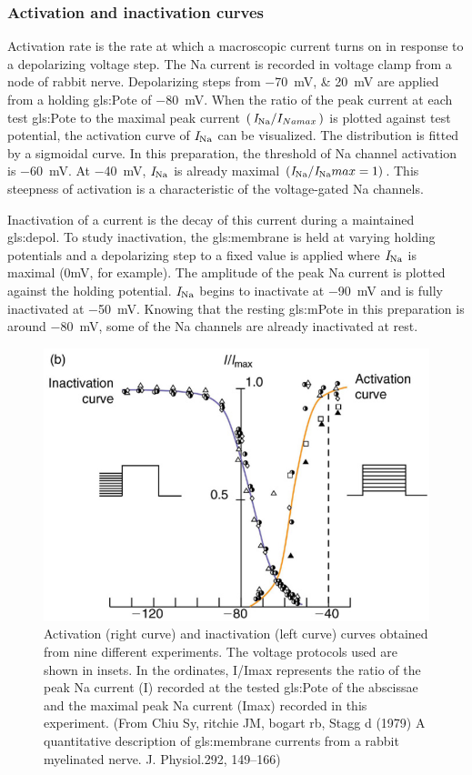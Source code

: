 \documentclass[class={myRUCProject}, crop=false]{standalone}
\begin{document}
\subsubsection{Activation and inactivation curves }
Activation rate is the rate at which a macroscopic current turns on in response to a depolarizing voltage step. The \gls{Na} current is recorded in voltage clamp from a node of rabbit nerve. Depolarizing steps from \qtylist{-70;20}{\mV} are applied from a holding \gls{gls:Pote} of \qty{-80}{\mV}. When the ratio of the peak current at each test \gls{gls:Pote} to the maximal peak current \(\br{\cur\sodium/I_{Namax}}\) is plotted against test potential, the activation curve of \(\mathit{I}_\mathrm{Na}\) can be visualized. The distribution is fitted by a sigmoidal curve. In this preparation, the threshold of \gls{Na} channel activation is \qty{-60}{\mV}. At \qty{-40}{\mV}, \(\mathit{I}_\mathrm{Na}\) is already maximal \((\mathit{I}_\mathrm{Na}/\mathit{I}_\mathrm{Na}{}max = 1)\). This steepness of activation is a characteristic of the voltage-gated \gls{Na} channels. 

Inactivation of a current is the decay of this current during a maintained \gls{gls:depol}. To study inactivation, the \gls{gls:membrane} is held at varying holding potentials and a depolarizing step to a fixed value is applied where \(\mathit{I}_\mathrm{Na}\) is maximal (0mV, for example). The amplitude of the peak \gls{Na} current is plotted against the holding potential. \(\mathit{I}_\mathrm{Na}\) begins to inactivate at \qty{-90}{\mV} and is fully inactivated at \qty{-50}{\mV}. Knowing that the resting \gls{gls:mPote} in this preparation is around \qty{-80}{\mV}, some of the \gls{Na} channels are already inactivated at rest. 
\begin{figure}[H]
  \centering
  \includegraphics[width=0.5\linewidth]{Pictures//Anakin/activ-inactiv.png}
  \caption{Activation (right curve) and inactivation (left curve) curves obtained from nine different experiments. The voltage protocols used are shown in insets. In the ordinates, I/Imax represents the ratio of the peak \gls{Na} current (I) recorded at the tested \gls{gls:Pote} of the abscissae and the maximal peak \gls{Na} current (Imax) recorded in this experiment. (From Chiu Sy, ritchie JM, bogart rb, Stagg d (1979) A quantitative description of \gls{gls:membrane} currents from a rabbit myelinated nerve. J. Physiol.292, 149–166) }
  \label{fig:enter-label}
\end{figure}
\end{document}
